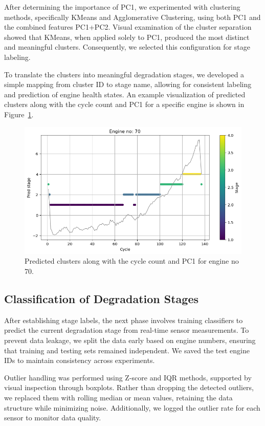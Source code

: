 \documentclass[conference]{IEEEtran}
\begin{document}
After determining the importance of PC1, we experimented with clustering methods, specifically KMeans and Agglomerative Clustering, using both PC1 and the combined features PC1+PC2. Visual examination of the cluster separation showed that KMeans, when applied solely to PC1, produced the most distinct and meaningful clusters. Consequently, we selected this configuration for stage labeling. 

To translate the clusters into meaningful degradation stages, we developed a simple mapping from cluster ID to stage name, allowing for consistent labeling and prediction of engine health states. An example visualization of predicted clusters along with the cycle count and PC1 for a specific engine is shown in Figure~\ref{fig:clustering_results}.

\begin{figure}[h]
    \centering
    \includegraphics[width=\linewidth]{clustered_engine.png}
    \caption{Predicted clusters along with the cycle count and PC1 for engine no 70.}
    \label{fig:clustering_results}
\end{figure}


\subsection{Classification of Degradation Stages}
After establishing stage labels, the next phase involves training classifiers to predict the current degradation stage from real-time sensor measurements. To prevent data leakage, we split the data early based on engine numbers, ensuring that training and testing sets remained independent. We saved the test engine IDs to maintain consistency across experiments.

Outlier handling was performed using Z-score and IQR methods, supported by visual inspection through boxplots. Rather than dropping the detected outliers, we replaced them with rolling median or mean values, retaining the data structure while minimizing noise. Additionally, we logged the outlier rate for each sensor to monitor data quality.
\end{document}
